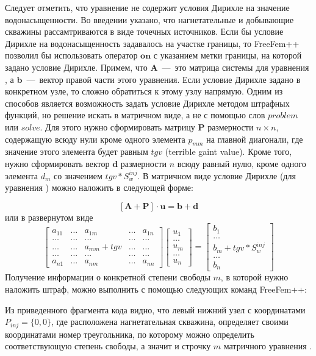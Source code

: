 Следует отметить, что уравнение  не содержит условия Дирихле на значение водонасыщенности.
Во введении указано, что нагнетательные и добывающие скважины рассамтриваются в виде точечных источников. Если бы условие
Дирихле на водонасыщенность задавалось на участке границы, то FreeFem++ позволил бы использовать оператор $\mathbf{on}$ 
с указанием метки границы, на которой задано условие Дирихле. Примем, что $\mathbf{A}$~---~это матрица системы для уравнения ,
а $\mathbf{b}$~---~вектор правой части этого уравнения. Если условие Дирихле задано в конкретном узле, то
сложно обратиться к этому узлу напрямую. Одним из способов является возможность задать условие Дирихле методом штрафных
функций, но решение искать в матричном виде, а не с помощью слов $problem$ или $solve$. Для этого нужно сформировать матрицу 
$\mathbf{P}$ размерности $n \times n$, 
содержащую всюду нули кроме одного элемента $p_{mm}$ на главной диагонали, где значение этого элемента будет равным $tgv$ 
(terrible gaint value). Кроме того, нужно сформировать вектор $\mathbf{d}$ размерности $n$ всюду равный нулю, кроме 
одного элемента $d_m$ со значением $tgv * S^{inj}_w$. В матричном виде условие Дирихле (для уравнения )
можно наложить в следующей форме:

\begin{equation}
	\left[ \mathbf{A} + \mathbf{P} \right] \cdot \mathbf{u}=\mathbf{b}+\mathbf{d}
\end{equation}
или в развернутом виде
\begin{equation}\label{eq:matrix}
	\begin{bmatrix}
	a_{11} & \dots & a_{1m} &\dots& a_{1n} \\
	\dots&\dots&\dots&\dots&\dots\\
	\dots&\dots&a_{mm}+tgv&\dots&\dots\\
	\dots&\dots&\dots&\dots&\dots\\
	a_{n1} & \dots&a_{nm}&\dots& a_{nn}
	\end{bmatrix}
	\begin{bmatrix}
	u_1 \\
	\dots \\
	u_m \\
	\dots\\
	u_n
	\end{bmatrix}
	=
	\begin{bmatrix}
	b_1 \\
	\dots \\
	b_m+tgv* S^{inj}_w\\
	\dots\\
	b_n
	\end{bmatrix}
\end{equation}
Получение информации о конкретной степени свободы $m$, в которой нужно наложить штраф, можно выполнить с 
помощью следующих команд FreeFem++:

Из приведенного фрагмента кода видно, что левый нижний узел с координатами $P_{inj}=\{0,0\}$, где расположена нагнетательная скважина,
определяет своими координатами номер треугольника, по которому можно определить соответствующую степень свободы, а значит и строчку $m$
матричного уравнения .\\


